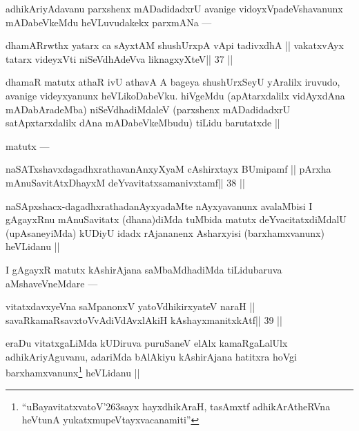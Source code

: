 \begin{artha}
adhikAriyAdavanu parxshenx mADadidadxrU avanige vidoyxVpadeVshavanunx mADabeVkeMdu heVLuvudakekx parxmANa ---
\end{artha}

\begin{shl}
dhamARrwthx yatarx ca sAyxtAM shushUrxpA vA\s pi tadivxdhA ||
vakatxvAyx tatarx videyxVti niSeVdhAdeVva liknagxyXteV\hfill || 37 ||
\end{shl}

\begin{artha}
dhamaR matutx athaR ivU athavA A bageya shushUrxSeyU yAralilx iruvudo, 
avanige videyxyanunx heVLikoDabeVku. hiVgeMdu (apAtarxdalilx vidAyxdAna mADabAradeMba) niSeVdhadiMdaleV (parxshenx mADadidadxrU satApxtarxdalilx dAna mADabeVkeMbudu) tiLidu barutatxde ||
\end{artha}

\begin{artha}
matutx ---
\end{artha}

\begin{shl}
\footnotemark[7]naSATxshavxdagadhxrathavanAnxyXyaM cA\s\s shirxtayx BUmipamf ||
pArxha mAnuSavitAtxDhayxM deYvavitatxsamanivxtamf\hfill || 38 ||
\end{shl}

\begin{artha}
naSApxshacx-dagadhxrathadanAyxyadaMte nAyxyavanunx avalaMbisi I gAgayxRnu mAnuSavitatx (dhana)diMda tuMbida matutx deYvacitatxdiMdalU (upAsaneyiMda) kUDiyU idadx rAjananenx Asharxyisi (barxhamxvanunx) heVLidanu ||
\end{artha}

\begin{artha}
I gAgayxR matutx kAshirAjana saMbaMdhadiMda tiLidubaruva aMshaveVneMdare ---
\end{artha} 

\begin{shl}
vitatxdavxyeVna saMpanonxV yatoV\s dhikirxyateV naraH ||
savaRkamaRsavxtoV\s vAdiVdAvxlAkiH kAshayxmanitxkAtf\hfill || 39 ||
\end{shl}

\begin{artha}
eraDu vitatxgaLiMda kUDiruva puruSaneV elAlx kamaRgaLalUlx adhikAriyAguvanu, adariMda bAlAkiyu kAshirAjana hatitxra hoVgi barxhamxvanunx\footnote[8]{``uBayavitatxvatoV\char'263sayx hayxdhikAraH, tasAmxtf adhikArAtheRVna heVtunA yukatxmupeVtayxvacanamiti''} heVLidanu ||
\end{artha}

